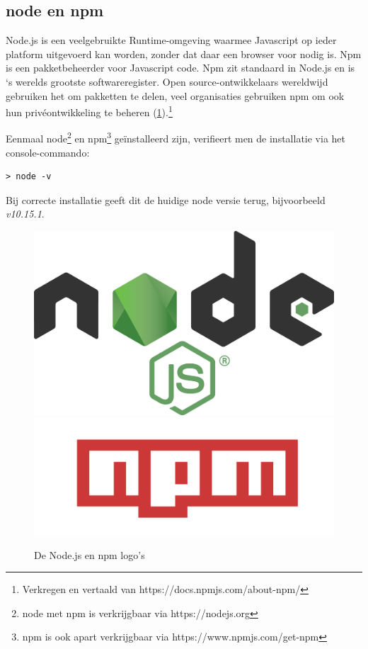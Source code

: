 \subsection{ node en npm}
Node.js is een veelgebruikte Runtime-omgeving waarmee Javascript op ieder platform uitgevoerd kan worden, zonder dat daar een browser voor nodig is. Npm is een pakketbeheerder voor Javascript code. Npm zit standaard in Node.js en is `s werelds grootste softwareregister. Open source-ontwikkelaars wereldwijd gebruiken het om pakketten te delen, veel organisaties gebruiken npm om ook hun privéontwikkeling te beheren (\ref{fig:nodejs}).\footnote{Verkregen en vertaald van https://docs.npmjs.com/about-npm/}

Eenmaal node\footnote{node met npm is verkrijgbaar via https://nodejs.org} en npm\footnote{npm is ook apart verkrijgbaar via https://www.npmjs.com/get-npm} geïnstalleerd zijn, verifieert men de installatie via het console-commando: 
\lstset{language=bash}
\begin{lstlisting}[numbers=none]
> node -v
\end{lstlisting}Bij correcte installatie geeft dit de huidige node versie terug, bijvoorbeeld \textit{v10.15.1}. 

\begin{figure}
	\includegraphics[width=\linewidth/2]{img/nodejs.png}
	\includegraphics[width=\linewidth/2]{img/npm.png}
	\caption{De Node.js en npm logo's}
	\label{fig:nodejs}
\end{figure}

